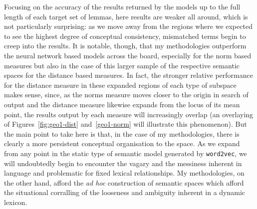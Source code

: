 Focusing on the accuracy of the results returned by the models up to the full length of each target set of lemmas, here results are weaker all around, which is not particularly surprising: as we move away from the regions where we expected to see the highest degree of conceptual consistency, mismatched terms begin to creep into the results.  It is notable, though, that my methodologies outperform the neural network based models across the board, especially for the norm based measures but also in the case of this larger sample of the respective semantic spaces for the distance based measures.  In fact, the stronger relative performance for the distance measure in these expanded regions of each type of subspace makes sense, since, as the norms measure moves closer to the origin in search of output and the distance measure likewise expands from the locus of its mean point, the results output by each measure will increasingly overlap (an overlaying of Figures~\ref{fig:geo1-dist} and~\ref{geo1-norm} will illustrate this phenomenon).  But the main point to take here is that, in the case of my methodologies, there is clearly a more persistent conceptual organisation to the space.  As we expand from any point in the static type of semantic model generated by \texttt{word2vec}, we will undoubtedly begin to encounter the vagary and the messiness inherent in language and problematic for fixed lexical relationships.  My methodologies, on the other hand, afford the \emph{ad hoc} construction of semantic spaces which afford the situational corralling of the looseness and ambiguity inherent in a dynamic lexicon.

